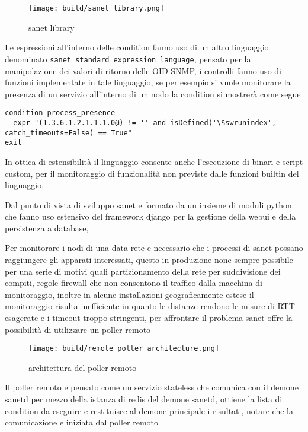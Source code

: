 \documentclass[12pt,a4paper,twoside,openright]{book}
\begin{document}
\begin{figure}[H]
    \centering
    \texttt{[image: build/sanet\_library.png]}
    \caption{sanet library}
    \label{fig:enter-label}
\end{figure}

Le espressioni all'interno delle condition fanno uso di un altro linguaggio denominato \verb|sanet standard expression language|, pensato per la manipolazione dei valori di ritorno delle OID SNMP, i controlli fanno uso di funzioni implementate in tale linguaggio, se per esempio si vuole monitorare la presenza di un servizio all'interno di un nodo la condition si mostrerà come segue

\begin{lstlisting}
condition process_presence
  expr "(1.3.6.1.2.1.1.1.0@) != '' and isDefined('\$swrunindex', catch_timeouts=False) == True"
exit
\end{lstlisting}

In ottica di estensibilità il linguaggio consente anche l'esecuzione di binari e script custom, per il monitoraggio di funzionalità non previste dalle funzioni builtin del linguaggio.

Dal punto di vista di sviluppo sanet e formato da un insieme di moduli python che fanno uso estensivo del framework django per la gestione della webui e della persistenza a database,

Per monitorare i nodi di una data rete e necessario che i processi di sanet possano raggiungere gli apparati interessati, questo in produzione none sempre possibile per una serie di motivi quali partizionamento della rete per suddivisione dei compiti, regole firewall che non consentono il traffico dalla macchina di monitoraggio, inoltre in alcune installazioni geograficamente estese il monitoraggio risulta inefficiente in quanto le distanze rendono le misure di RTT esagerate e i timeout troppo stringenti, per affrontare il problema sanet offre la possibilità di utilizzare un poller remoto

\begin{figure}[H]
    \centering
    \texttt{[image: build/remote\_poller\_architecture.png]}
    \caption{architettura del poller remoto}
    \label{fig:enter-label} \end{figure}

Il poller remoto e pensato come un servizio stateless che comunica con il demone sanetd per mezzo della istanza di redis del demone sanetd, ottiene la lista di condition da eseguire e restituisce al demone principale i risultati, notare che la comunicazione e iniziata dal poller remoto
\end{document}

